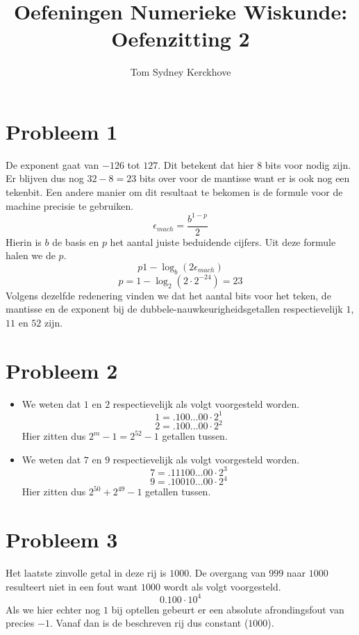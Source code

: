 \documentclass[12pt,a4paper]{article}
\author{Tom Sydney Kerckhove}
\title{Oefeningen Numerieke Wiskunde:\\ Oefenzitting 2}
\begin{document}
\maketitle

\section{Probleem 1}
De exponent gaat van $-126$ tot $127$. Dit betekent dat hier $8$ bits voor nodig zijn. Er blijven dus nog $32-8 = 23$ bits over voor de mantisse want er is ook nog een tekenbit.
Een andere manier om dit resultaat te bekomen is de formule voor de machine precisie te gebruiken.
\[
\epsilon_{mach} = \frac{b^{1-p}}{2}
\]
Hierin is $b$ de basis en $p$ het aantal juiste beduidende cijfers.
Uit deze formule halen we de $p$.
\[
p 1-\log_{b}(2\epsilon_{mach})
\]
\[
p = 1-\log_{2}(2\cdot 2^{-24}) = 23
\]
Volgens dezelfde redenering vinden we dat het aantal bits voor het teken, de mantisse en de exponent bij de dubbele-nauwkeurigheidsgetallen respectievelijk $1$, $11$ en $52$ zijn.

\section{Probleem 2}
\begin{itemize}
\item We weten dat $1$ en $2$ respectievelijk als volgt voorgesteld worden.
\[1 = .100\ldots00 \cdot 2^1\]
\[2 = .100\ldots00 \cdot 2^2\]
Hier zitten dus $2^m-1=2^{52}-1$ getallen tussen.
\item We weten dat $7$ en $9$ respectievelijk als volgt voorgesteld worden.
\[7 = .11100\ldots00 \cdot 2^3\]
\[9 = .10010\ldots00 \cdot 2^4\]
Hier zitten dus $2^{50}+2^{49}-1$ getallen tussen.
\end{itemize}

\section{Probleem 3}
Het laatste zinvolle getal in deze rij is $1000$. De overgang van $999$ naar $1000$ resulteert niet in een fout want $1000$ wordt als volgt voorgesteld.
\[0.100 \cdot 10^4\]
Als we hier echter nog $1$ bij optellen gebeurt er een absolute afrondingsfout van precies $-1$. Vanaf dan is de beschreven rij dus constant ($1000$).
\end{document}
